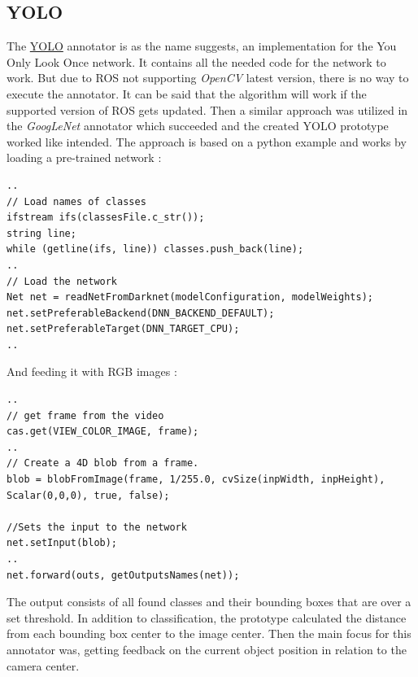 \documentclass[main.tex]{subfiles}
\begin{document}
				\subsection{YOLO}
The \href{https://github.com/SUTURO/suturo_perception/blob/Handcamera_tracking/rs_Athene/src/Yolo.cpp}{YOLO} annotator is as the name suggests, an implementation for the You Only Look Once network. It contains all the needed code for the network to work.
But due to ROS not supporting \textit{OpenCV} latest version, there is no way to execute the annotator. It can be said that the algorithm will work if the supported version of ROS gets updated. Then a similar approach was utilized in the \textit{GoogLeNet} annotator which succeeded and the created YOLO prototype worked like intended.
The approach is based on a python example and works by loading a pre-trained network : 
\begin{lstlisting}
..
// Load names of classes
ifstream ifs(classesFile.c_str());
string line;
while (getline(ifs, line)) classes.push_back(line);
..
// Load the network
Net net = readNetFromDarknet(modelConfiguration, modelWeights);
net.setPreferableBackend(DNN_BACKEND_DEFAULT);
net.setPreferableTarget(DNN_TARGET_CPU);
..
\end{lstlisting}
And feeding it with RGB images : 
\begin{lstlisting}
..
// get frame from the video
cas.get(VIEW_COLOR_IMAGE, frame);
..
// Create a 4D blob from a frame.
blob = blobFromImage(frame, 1/255.0, cvSize(inpWidth, inpHeight), Scalar(0,0,0), true, false);
        
//Sets the input to the network
net.setInput(blob);
..
net.forward(outs, getOutputsNames(net));
\end{lstlisting}

The output consists of all found classes and their bounding boxes that are over a set threshold.
In addition to classification, the prototype calculated the distance from each bounding box center to the image center. 
Then the main focus for this annotator was, getting feedback on the current object position in relation to the camera center.
\end{document}
